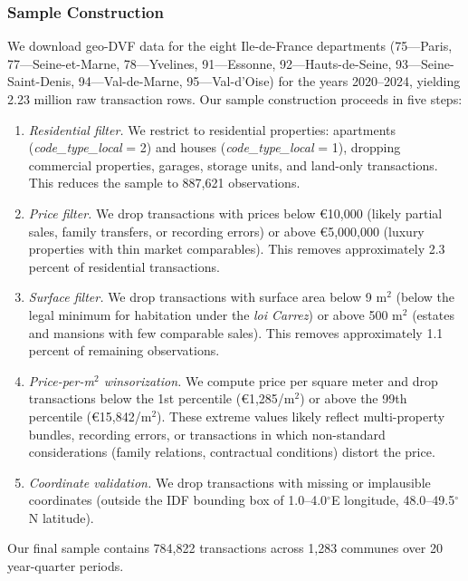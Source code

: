 \documentclass[12pt]{article}
\begin{document}
\subsubsection{Sample Construction}

We download geo-DVF data for the eight Ile-de-France departments (75---Paris, 77---Seine-et-Marne, 78---Yvelines, 91---Essonne, 92---Hauts-de-Seine, 93---Seine-Saint-Denis, 94---Val-de-Marne, 95---Val-d'Oise) for the years 2020--2024, yielding 2.23 million raw transaction rows. Our sample construction proceeds in five steps:

\begin{enumerate}
\item \textit{Residential filter.} We restrict to residential properties: apartments (\textit{code\_type\_local} = 2) and houses (\textit{code\_type\_local} = 1), dropping commercial properties, garages, storage units, and land-only transactions. This reduces the sample to 887,621 observations.

\item \textit{Price filter.} We drop transactions with prices below \euro10,000 (likely partial sales, family transfers, or recording errors) or above \euro5,000,000 (luxury properties with thin market comparables). This removes approximately 2.3 percent of residential transactions.

\item \textit{Surface filter.} We drop transactions with surface area below 9 m$^2$ (below the legal minimum for habitation under the \textit{loi Carrez}) or above 500 m$^2$ (estates and mansions with few comparable sales). This removes approximately 1.1 percent of remaining observations.

\item \textit{Price-per-m$^2$ winsorization.} We compute price per square meter and drop transactions below the 1st percentile (\euro1,285/m$^2$) or above the 99th percentile (\euro15,842/m$^2$). These extreme values likely reflect multi-property bundles, recording errors, or transactions in which non-standard considerations (family relations, contractual conditions) distort the price.

\item \textit{Coordinate validation.} We drop transactions with missing or implausible coordinates (outside the IDF bounding box of 1.0--4.0$^{\circ}$E longitude, 48.0--49.5$^{\circ}$N latitude).
\end{enumerate}

Our final sample contains 784,822 transactions across 1,283 communes over 20 year-quarter periods.
\end{document}
